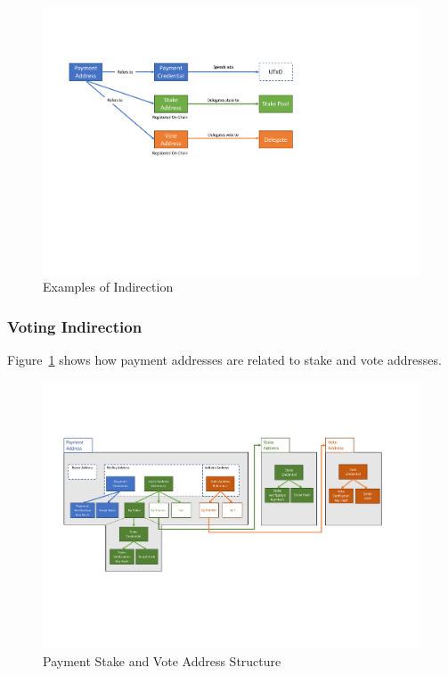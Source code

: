 \begin{figure}[h]
  \includegraphics[trim=0 150 0 80,clip,width=\textwidth]{Indirection}
  \caption{Examples of Indirection}
  \label{fig:indirection}
\end{figure}

\subsubsection*{Voting Indirection}

Figure~\ref{fig:indirection} shows how payment addresses are related to stake and vote addresses.

\begin{figure}[h]
  \includegraphics[trim=0 150 0 80,clip,width=\textwidth]{Address-Structure}
  \caption{Payment Stake and Vote Address Structure}
  \label{fig:address-structure}
\end{figure}

